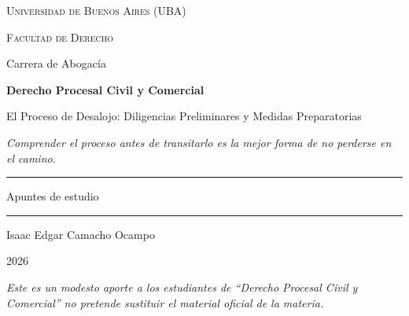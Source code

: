 \documentclass[12pt,oneside]{book}
\newcommand{\universidad}{Universidad de Buenos Aires (UBA)}
\newcommand{\facultad}{Facultad de Derecho}
\newcommand{\carrerauniv}{Carrera de Abogacía}
\newcommand{\materia}{Derecho Procesal Civil y Comercial}
\newcommand{\titulo}{El Proceso de Desalojo: Diligencias Preliminares y Medidas Preparatorias}
\newcommand{\autor}{Isaac Edgar Camacho Ocampo}
\newcommand{\anio}{2026}
\begin{document}
\begin{titlepage}
\thispagestyle{empty}

\begin{center}

\vspace*{1cm}

{\large \textsc{\universidad}}

\vspace{0.2cm}

{\large \textsc{\facultad}}

\vspace{0.2cm}

{\large \carrerauniv}

\vspace{3cm}

{\Huge \textbf{\materia}}

\vspace{1cm}

{\LARGE \titulo}

\vspace{0.8cm}

\textit{Comprender el proceso antes de transitarlo es la mejor forma de no perderse en el camino.}

\vspace{1.2cm}

\rule{0.70\textwidth}{0.5pt}

\vspace{0.5cm}

{\large Apuntes de estudio}

\vspace{0.5cm}

\rule{0.70\textwidth}{0.5pt}

\vfill

{\large \autor}

\vspace{0.3cm}

{\large \anio}

\end{center}

\vfill

\begin{flushleft}
\textit{Este es un modesto aporte a los estudiantes de ``Derecho Procesal Civil y Comercial'' no pretende sustituir el material oficial de la materia.}
\end{flushleft}

\end{titlepage}
\end{document}
